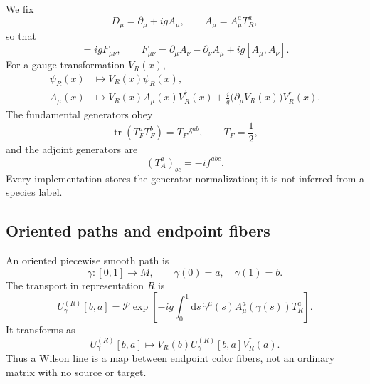 \documentclass[11pt]{article}
\newcommand{\dd}{\mathrm{d}}
\newcommand{\tr}{\operatorname{tr}}
\newcommand{\Tord}{\mathcal P}
\begin{document}
We fix
\begin{equation}
 D_\mu=\partial_\mu+igA_\mu,
 \qquad
 A_\mu=A_\mu^aT_R^a,
\label{eq:covariant-derivative}
\end{equation}
so that
\begin{equation}
 [D_\mu,D_\nu]=igF_{\mu\nu},
 \qquad
 F_{\mu\nu}
 =\partial_\mu A_\nu-\partial_\nu A_\mu
 +ig[A_\mu,A_\nu].
\label{eq:field-strength-convention}
\end{equation}
For a gauge transformation \(V_R(x)\),
\begin{align}
 \psi_R(x)&\longmapsto V_R(x)\psi_R(x),
\nonumber\\
 A_\mu(x)&\longmapsto
 V_R(x)A_\mu(x)V_R^\dagger(x)
 +\frac{i}{g}\bigl(\partial_\mu V_R(x)\bigr)V_R^\dagger(x).
\label{eq:gauge-transformation}
\end{align}
The fundamental generators obey
\begin{equation}
 \tr(T_F^aT_F^b)=T_F\delta^{ab},
 \qquad T_F=\frac12,
\label{eq:fundamental-normalization}
\end{equation}
and the adjoint generators are
\begin{equation}
 (T_A^a)_{bc}=-if^{abc}.
\label{eq:adjoint-generator}
\end{equation}
Every implementation stores the generator normalization; it is not inferred
from a species label.

\subsection{Oriented paths and endpoint fibers}

An oriented piecewise smooth path is
\begin{equation}
 \gamma:[0,1]\longrightarrow M,
 \qquad
 \gamma(0)=a,
 \quad
 \gamma(1)=b.
\label{eq:path-definition}
\end{equation}
The transport in representation \(R\) is
\begin{equation}
 U_\gamma^{(R)}[b,a]
 =\Tord\exp\!\left[-ig\int_0^1\dd s\,
 \dot\gamma^\mu(s)A_\mu^a(\gamma(s))T_R^a\right].
\label{eq:path-transport}
\end{equation}
It transforms as
\begin{equation}
 U_\gamma^{(R)}[b,a]
 \longmapsto
 V_R(b)U_\gamma^{(R)}[b,a]V_R^\dagger(a).
\label{eq:path-gauge-covariance}
\end{equation}
Thus a Wilson line is a map between endpoint color fibers, not an ordinary
matrix with no source or target.
\end{document}
